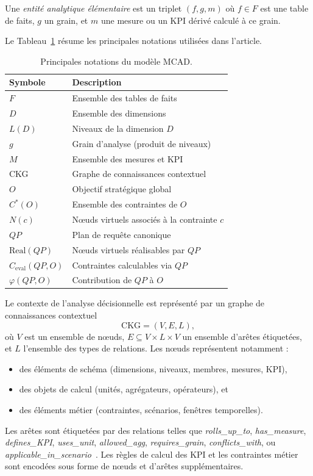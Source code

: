 \documentclass[journal]{IEEEtran}
\begin{document}
Une \emph{entité analytique élémentaire} est un triplet $(f,g,m)$ où $f\in F$ est une table de faits, $g$ un grain, et $m$ une mesure ou un KPI dérivé calculé à ce grain.

Le Tableau~\ref{tab:notation} résume les principales notations utilisées dans l'article.

\begin{table}[!t]
\centering
\caption{Principales notations du modèle MCAD.}
\begin{tabular}{@{}ll@{}}
\toprule
Symbole & Description \\
\midrule
$F$ & Ensemble des tables de faits \\
$D$ & Ensemble des dimensions \\
$L(D)$ & Niveaux de la dimension $D$ \\
$g$ & Grain d'analyse (produit de niveaux) \\
$M$ & Ensemble des mesures et KPI \\
CKG & Graphe de connaissances contextuel \\
$O$ & Objectif stratégique global \\
$C^*(O)$ & Ensemble des contraintes de $O$ \\
$N(c)$ & Nœuds virtuels associés à la contrainte $c$ \\
$QP$ & Plan de requête canonique \\
$\mathrm{Real}(QP)$ & Nœuds virtuels réalisables par $QP$ \\
$C_{\mathrm{eval}}(QP,O)$ & Contraintes calculables via $QP$ \\
$\varphi(QP,O)$ & Contribution de $QP$ à $O$ \\
\bottomrule
\end{tabular}
\label{tab:notation}
\end{table}

Le contexte de l'analyse décisionnelle est représenté par un graphe de connaissances contextuel
\[
\mathrm{CKG}=(V,E,L),
\]
où $V$ est un ensemble de nœuds, $E\subseteq V\times L\times V$ un ensemble d'arêtes étiquetées, et $L$ l'ensemble des types de relations. Les nœuds représentent notamment :
\begin{itemize}
  \item des éléments de schéma (dimensions, niveaux, membres, mesures, KPI),
  \item des objets de calcul (unités, agrégateurs, opérateurs), et
  \item des éléments métier (contraintes, scénarios, fenêtres temporelles).
\end{itemize}
Les arêtes sont étiquetées par des relations telles que \textit{rolls\_up\_to}, \textit{has\_measure}, \textit{defines\_KPI}, \textit{uses\_unit}, \textit{allowed\_agg}, \textit{requires\_grain}, \textit{conflicts\_with}, ou \textit{applicable\_in\_scenario}~\cite{HoganKGSurvey2021,DiamantiniKPISurvey2025,Niedritis2011,RomeroAbello2010}. Les règles de calcul des KPI et les contraintes métier sont encodées sous forme de nœuds et d'arêtes supplémentaires.
\end{document}
